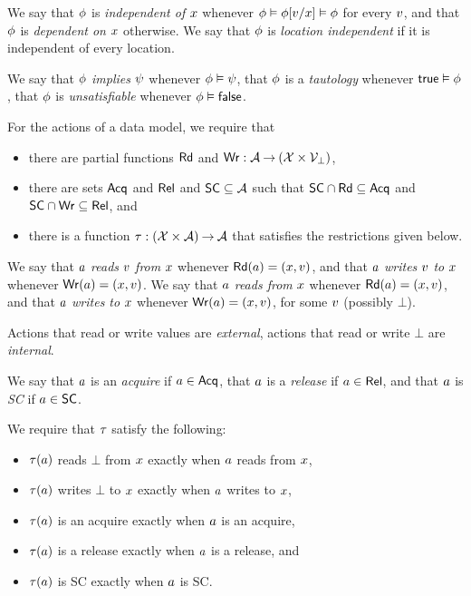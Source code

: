 We say that $\phi$ is \emph{independent of $x$} whenever
$\phi \vDash \phi[v/x] \vDash \phi$ for every $v$, and that
$\phi$ is \emph{dependent on $x$} otherwise.  We say that $\phi$ is
\emph{location independent} if it is independent of every location.

We say that $\phi$ \emph{implies} $\psi$ whenever $\phi\vDash\psi$,
that $\phi$ is a \emph{tautology} whenever $\mathsf{true}\vDash\phi$, that
$\phi$ is \emph{unsatisfiable} whenever $\phi\vDash\mathsf{false}$.

For the actions of a data model, we require that
\begin{itemize}
\item there are partial functions $\mathsf{Rd}$ and
  $\mathsf{Wr}: \mathcal{A} \mathbin\rightarrow (\mathcal{X} \times \mathcal{V}_\bot)$,
\item there are sets $\mathsf{Acq}$ and $\mathsf{Rel}$ and $\mathsf{SC} \subseteq\mathcal{A}$ such that
  $\mathsf{SC}\cap\mathsf{Rd}\subseteq\mathsf{Acq}$ and
  $\mathsf{SC}\cap\mathsf{Wr}\subseteq\mathsf{Rel}$, and
\item there is a function $\tau: (\mathcal{X}\times\mathcal{A}) \mathbin\rightarrow \mathcal{A}$ that
  satisfies the restrictions given below.
\end{itemize}

We say that $a$ \emph{reads} $v$ \emph{from} $x$ whenever
$\mathsf{Rd}(a) = (x,v)$, and that $a$ \emph{writes} $v$
\emph{to} $x$ whenever $\mathsf{Wr}(a) = (x,v)$.
We say that $a$ \emph{reads from} $x$ whenever
$\mathsf{Rd}(a) = (x,v)$, and that $a$ \emph{writes to}
$x$ whenever $\mathsf{Wr}(a) = (x,v)$, for some $v$ (possibly $\bot$).

Actions that read or write values are \emph{external},
actions that read or write $\bot$ are \emph{internal}.

We say that $a$ is an \emph{acquire} if $a\in\mathsf{Acq}$, that $a$
is a \emph{release} if $a\in\mathsf{Rel}$, and that $a$ is \emph{SC} if $a\in\mathsf{SC}$.  

We require that $\tau$ satisfy the following:
\begin{itemize}
\item $\tau(a)$ reads $\bot$ from $x$ exactly when $a$ reads from $x$,
\item $\tau(a)$ writes $\bot$ to $x$ exactly when $a$ writes to $x$,
\item $\tau(a)$ is an acquire exactly when $a$ is an acquire, 
\item $\tau(a)$ is a release exactly when $a$ is a release, and
\item $\tau(a)$ is SC exactly when $a$ is SC. 
\end{itemize}

